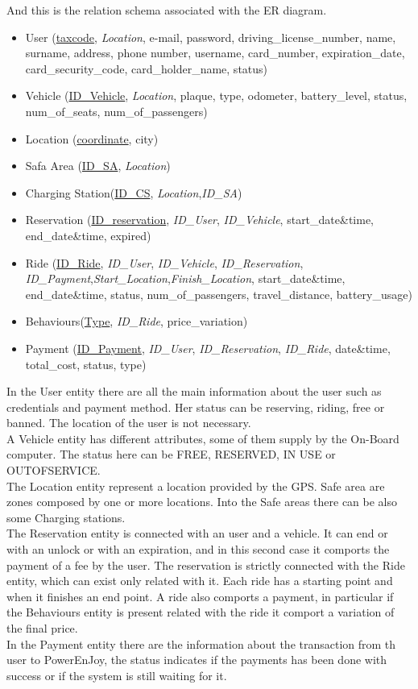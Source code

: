  And this is the relation schema associated with the ER diagram.
\begin{itemize} 
	\item{User (\underline{taxcode}, \textit{Location}, e-mail, password, driving\_license\_number, name, surname, address, phone number, username, card\_number, expiration\_date, card\_security\_code, card\_holder\_name, status)} %
	\item{Vehicle (\underline{ID\_Vehicle}, \textit{Location}, plaque, type, odometer, battery\_level, status, num\_of\_seats, num\_of\_passengers) }
	\item{Location (\underline{coordinate}, city)}	
	\item{Safa Area (\underline{ID\_SA}, \textit{Location})} %
	\item{Charging Station(\underline{ID\_CS}, \textit{Location},\textit{ID\_SA})}
	\item{Reservation (\underline{ID\_reservation}, \textit{ID\_User}, \textit{ID\_Vehicle}, start\_date\&time, end\_date\&time, expired)}
	\item{Ride (\underline{ID\_Ride}, \textit{ID\_User}, \textit{ID\_Vehicle}, \textit{ID\_Reservation}, \textit{ID\_Payment},\textit{Start\_Location},\textit{Finish\_Location}, start\_date\&time, end\_date\&time, status, num\_of\_passengers, travel\_distance, battery\_usage)}
	\item{Behaviours(\underline{Type}, \textit{ID\_Ride}, price\_variation)}
	\item{Payment (\underline{ID\_Payment}, \textit{ID\_User}, \textit{ID\_Reservation}, \textit{ID\_Ride}, date\&time, total\_cost, status, type)}
\end{itemize}
In the User entity there are all the main information about the user such as credentials and payment method. Her status can be reserving, riding, free or banned. The location of the user is not necessary.
\\A Vehicle entity has different attributes, some of them supply by the On-Board computer. The status here can be FREE, RESERVED, IN USE or OUTOFSERVICE.
\\The Location entity represent a location provided by the GPS. Safe area are zones composed by one or more locations. Into the Safe areas there can be also some Charging stations.
\\The Reservation entity is connected with an user and a vehicle. It can end or with an unlock or with an expiration, and in this second case it comports the payment of a fee by the user. The reservation is strictly connected with the Ride entity, which can exist only related with it. Each ride has a starting point and when it finishes an end point. A ride also comports a payment, in particular if the Behaviours entity is present related with the ride it comport a variation of the final price. 
\\In the Payment entity there are the information about the transaction from th user to PowerEnJoy, the status indicates if the payments has been done with success or if the system is still waiting for it.

